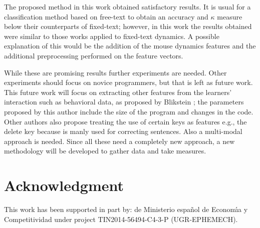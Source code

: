 \documentclass[a4paper,twoside]{article}
\begin{document}
The proposed method in this work obtained
satisfactory results. It is usual for a classification method based on free-text
to obtain an accuracy and $\kappa$ measure below their counterparts of
fixed-text; however, in this
work the results obtained were similar to those works applied to fixed-text 
dynamics. A possible explanation of this would be the addition of the mouse 
dynamics features and the additional preprocessing performed on the
feature vectors.


While these are promising results further experiments are needed. Other experiments
should focus on novice programmers, but that is left as future
work. This 
future work will focus on extracting other features from the learners' interaction
such as behavioral data, as proposed by Blikstein
\cite{blikstein2011using}; the parameters proposed by this author include the size
of the program and changes in the code. Other authors also propose treating the use
of certain keys as features e.g., the delete key because is manly used for correcting
sentences. Also a multi-modal approach is needed. Since all these need
a completely new approach, a new methodology will be developed to
gather data and take measures.  

\section*{Acknowledgment} 
This work has been supported in part by: de Ministerio espa\~{n}ol de Econom\'{\i}a y Competitividad under project TIN2014-56494-C4-3-P (UGR-EPHEMECH).

 



\vfill
\end{document}
